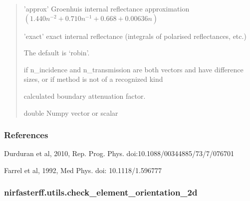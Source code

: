\documentclass[letterpaper,10pt,english]{sphinxmanual}
\begin{document}
\begin{fulllineitems}
\begin{quote}
\begin{description}
\begin{itemize}
\sphinxAtStartPar
’approx’ \sphinxhyphen{} Groenhuis internal reflectance approximation \((1.440n^{-2} + 0.710n^{-1} + 0.668 + 0.00636n)\)

\sphinxAtStartPar
’exact’  \sphinxhyphen{} exact internal reflectance (integrals of polarised reflectances, etc.)

\sphinxAtStartPar
The default is ‘robin’.


\end{itemize}

\sphinxAtStartPar
{} \textendash{} if n\_incidence and n\_transmission are both vectors and have difference sizes, or if method is not of a recognized kind

\sphinxAtStartPar
{} \textendash{} calculated boundary attenuation factor.

\sphinxAtStartPar
double Numpy vector or scalar

\end{description}\end{quote}
\subsubsection*{References}

\sphinxAtStartPar
Durduran et al, 2010, Rep. Prog. Phys. doi:10.1088/0034\sphinxhyphen{}4885/73/7/076701

\sphinxAtStartPar
Farrel et al, 1992, Med Phys. doi: 10.1118/1.596777

\end{fulllineitems}


\sphinxstepscope


\subsubsection{nirfasterff.utils.check\_element\_orientation\_2d}
\label{\detokenize{_autosummary/nirfasterff.utils.check_element_orientation_2d:nirfasterff-utils-check-element-orientation-2d}}\label{\detokenize{_autosummary/nirfasterff.utils.check_element_orientation_2d::doc}}
\end{document}
